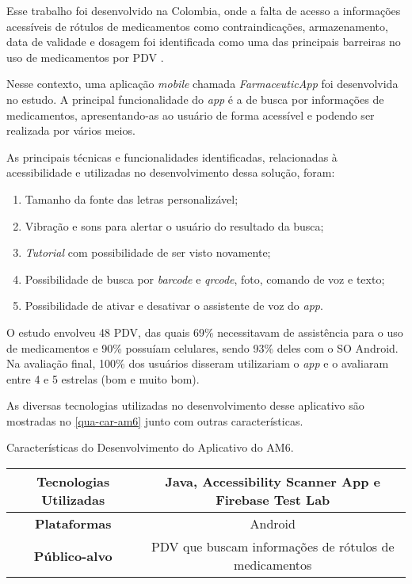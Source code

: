 Esse trabalho foi desenvolvido na Colombia, onde a falta de acesso a informações acessíveis
de rótulos de medicamentos como contraindicações, armazenamento, data de validade e dosagem foi identificada como uma
das principais barreiras no uso de medicamentos por PDV \cite{Amariles2020}.

Nesse contexto, uma aplicação \emph{mobile} chamada \emph{FarmaceuticApp} foi desenvolvida no estudo.
A principal funcionalidade do \emph{app} é a de busca por informações de medicamentos, apresentando-as
ao usuário de forma acessível e podendo ser realizada por vários meios.

As principais técnicas e funcionalidades identificadas, relacionadas à acessibilidade e utilizadas no desenvolvimento dessa solução, foram:

\begin{enumerate}
  \item Tamanho da fonte das letras personalizável;
  \item Vibração e sons para alertar o usuário do resultado da busca;
  \item \emph{Tutorial} com possibilidade de ser visto novamente;
  \item Possibilidade de busca por \emph{barcode} e \emph{qrcode}, foto, comando de voz e texto;
  \item Possibilidade de ativar e desativar o assistente de voz do \emph{app}.
\end{enumerate}

O estudo envolveu 48 PDV, das quais 69\% necessitavam de assistência para o uso de medicamentos e 90\% possuíam celulares, sendo 93\%  deles com o SO Android.
Na avaliação final, 100\% dos usuários disseram utilizariam o \emph{app} e o avaliaram entre 4 e 5 estrelas (bom e muito bom).

As diversas tecnologias utilizadas no desenvolvimento desse aplicativo são mostradas no \autoref{qua-car-am6}
junto com outras características.

\begin{quadro}[htb!]
  \caption{\label{qua-car-am6}Características do Desenvolvimento do Aplicativo do AM6.}
  \begin{tabular}{|c|c|}
    \hline
    \textbf{Tecnologias Utilizadas} & Java, Accessibility Scanner App e Firebase Test Lab   \\ \hline
    \textbf{Plataformas}            & Android                                               \\ \hline
    \textbf{Público-alvo}           & PDV que buscam informações de rótulos de medicamentos \\
    \hline
  \end{tabular}
\end{quadro}

